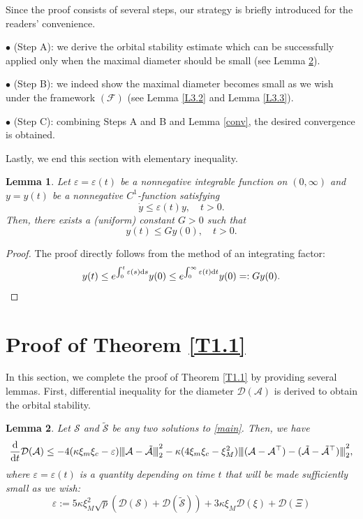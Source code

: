 \documentclass[11pt,reqno]{amsart}
\numberwithin{figure}{section}
\newcommand{\opnorm}[1]{{ \vert\kern-0.25ex \vert\kern-0.25ex \vert #1 
     \vert\kern-0.25ex \vert\kern-0.25ex \vert}}
\newcommand{\kp}{\kappa}
\newcommand{\veps}{\varepsilon}
\newcommand{\dd}{  {\textup{d}} }
\newcommand{\dt} {    {  \textup{d}t   }    }
\newtheorem{lemma}{Lemma}[section]
\begin{document}
Since the proof consists of several steps, our strategy is briefly introduced for the readers' convenience.

$\bullet$ (Step A):   we derive the orbital stability estimate which can be successfully applied only when the maximal diameter should be small (see Lemma \ref{L3.1}). 

$\bullet$ (Step B): we indeed show the maximal diameter becomes small as we wish under the framework $(\mathcal F)$ (see Lemma \ref{L3.2} and Lemma \ref{L3.3}).

$\bullet$ (Step C): combining Steps A and B and Lemma \ref{conv}, the desired convergence is obtained. 

 


\vspace{0.5cm}





Lastly, we end this section with elementary inequality. 
\begin{lemma} \label{L2.2}
Let $\veps = \veps(t)$ be a nonnegative integrable function on $(0,\infty)$ and   $y=y(t)$ be a nonnegative $C^1$-function satisfying
\[
\dot y \leq \veps(t) y,\quad t>0.
\]
Then, there exists a (uniform) constant $G>0$ such that
\[
y(t) \leq G y(0),\quad t>0.
\]
\end{lemma}

\begin{proof}
The proof directly follows from the method of an integrating factor:
\begin{align*}
y(t) \leq e^{\int_0^t \veps(s) \dd s }y(0) \leq e^{\int_0^\infty \veps(t) \dd t }y(0) =: Gy(0).
\end{align*}
\end{proof}


 



\section{Proof of Theorem \ref{T1.1}} \label{sec:3}
\setcounter{equation}{0}
In this section, we complete the proof of Theorem \ref{T1.1} by providing several lemmas.  First, differential inequality  for the diameter $\mathcal D(\mathcal A)$ is derived to obtain the orbital stability. 



\begin{lemma} \label{L3.1}
Let $\mathcal S$ and $\tilde{\mathcal S}$ be any two solutions to \eqref{main}. Then, we have
\[
\frac\dd\dt \mathcal D(\mathcal A) \leq  -4 (\kp\xi_m\xi_c - \veps) \opnorm{\mathcal A- \tilde{\mathcal A}}_2^2 -\kp ( 4\xi_m \xi_c - \xi_M^2) \opnorm{(\mathcal A - \mathcal A^\top) - (\tilde{\mathcal A} - \tilde{\mathcal A}^\top)   }_2^2,
\]
where $\veps=\veps(t)$ is a quantity depending on time $t$ that will be made sufficiently small as we wish:
\[
\veps := 5 \kp \xi_M^2\sqrt p (\mathcal D(\mathcal S) + \mathcal D(\tilde{\mathcal S})) +3 \kp \xi_M \mathcal D(\xi) + \mathcal D(\Xi)
\]
\end{lemma}
\end{document}
